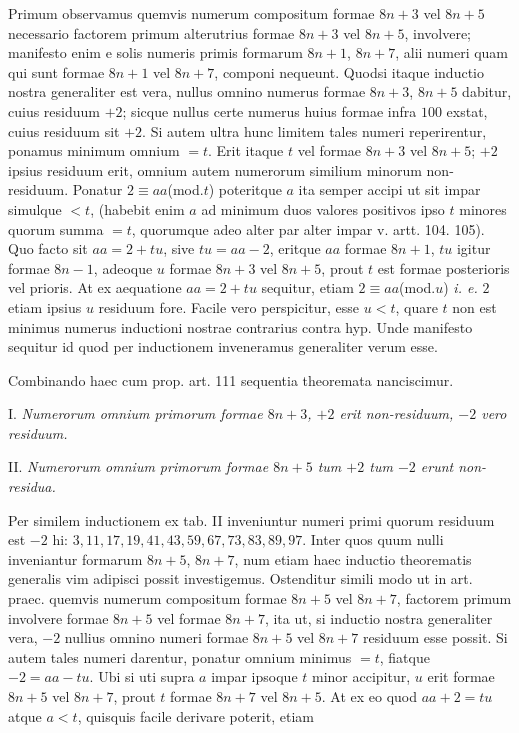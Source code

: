 Primum observamus quemvis numerum compositum formae $8n+3$ vel $8n+5$ necessario factorem primum alterutrius formae $8n+3$ vel $8n+5$, involvere; manifesto enim e solis numeris primis formarum $8n+1$, $8n+7$, alii numeri quam qui sunt formae $8n+1$ vel $8n+7$, componi nequeunt. Quodsi itaque inductio nostra generaliter est vera, nullus omnino numerus formae $8n+3$, $8n+5$ dabitur, cuius residuum $+2$; sicque nullus certe numerus huius formae infra $100$ exstat, cuius residuum sit $+2$. Si autem ultra hunc limitem tales numeri reperirentur, ponamus minimum omnium $=t$. Erit itaque $t$ vel formae $8n+3$ vel $8n+5$; $+2$ ipsius residuum erit, omnium autem numerorum similium minorum non-residuum. Ponatur $2\equiv aa$(mod.$t$) poteritque $a$ ita semper accipi ut sit impar simulque $<t$, (habebit enim $a$ ad minimum duos valores positivos ipso $t$ minores quorum summa $=t$, quorumque adeo alter par alter impar v. artt. 104. 105). Quo facto sit $aa=2+tu$, sive $tu=aa-2$, eritque $aa$ formae $8n+1$, $tu$ igitur formae $8n-1$, adeoque $u$ formae $8n+3$ vel $8n+5$, prout $t$ est formae posterioris vel prioris. At ex aequatione $aa=2+tu$ sequitur, etiam $2\equiv aa$(mod.$u$) \emph{i. e.} $2$ etiam ipsius $u$ residuum fore. Facile vero perspicitur, esse $u<t$, quare $t$ non est minimus numerus inductioni nostrae contrarius contra hyp. Unde manifesto sequitur id quod per inductionem inveneramus generaliter verum esse.

Combinando haec cum prop. art. 111 sequentia theoremata nanciscimur.

I. \emph{Numerorum omnium primorum formae $8n+3$, $+2$ erit non-residuum, $-2$ vero residuum.}

II. \emph{Numerorum omnium primorum formae $8n+5$ tum $+2$ tum $-2$ erunt non-residua.}

Per similem inductionem ex tab. II inveniuntur numeri primi quorum residuum est $-2$ hi: $3,11,17,19,41,43,59,67,73,83,89,97$. Inter quos quum nulli inveniantur formarum $8n+5$, $8n+7$, num etiam haec inductio theorematis generalis vim adipisci possit investigemus. Ostenditur simili modo ut in art. praec. quemvis numerum compositum formae $8n+5$ vel $8n+7$, factorem primum involvere formae $8n+5$ vel formae $8n+7$, ita ut, si inductio nostra generaliter vera, $-2$ nullius omnino numeri formae $8n+5$ vel $8n+7$ residuum esse possit. Si autem tales numeri darentur, ponatur omnium minimus $=t$, fiatque $-2=aa-tu$. Ubi si uti supra $a$ impar ipsoque $t$ minor accipitur, $u$ erit formae $8n+5$ vel $8n+7$, prout $t$ formae $8n+7$ vel $8n+5$. At ex eo quod $aa+2=tu$ atque $a<t$, quisquis facile derivare poterit, etiam
